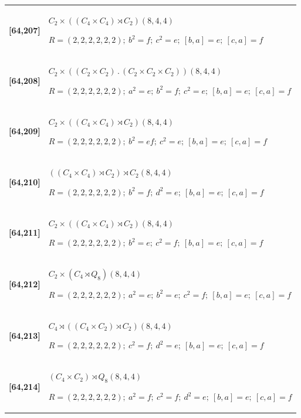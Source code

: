 \documentclass[UTF8,fontset=fandol,11pt,a4paper]{ctexart}
\begin{document}
\begin{longtable}{@{}p{17mm}>{\raggedright\arraybackslash}p{141mm}@{}}
\textbf{[64,207]} & $C_{2}\times ((C_{4}\times C_{4})\rtimes C_{2})$\quad $(8,4,4)$\par\(R=(2,2,2,2,2,2);\allowbreak\ b^{2}=f;\allowbreak\ c^{2}=e;\allowbreak\ [b,a]=e;\allowbreak\ [c,a]=f\)\\[3pt]

\textbf{[64,208]} & $C_{2}\times ((C_{2}\times C_{2})\mathbin{.} (C_{2}\times C_{2}\times C_{2}))$\quad $(8,4,4)$\par\(R=(2,2,2,2,2,2);\allowbreak\ a^{2}=e;\allowbreak\ b^{2}=f;\allowbreak\ c^{2}=e;\allowbreak\ [b,a]=e;\allowbreak\ [c,a]=f\)\\[3pt]

\textbf{[64,209]} & $C_{2}\times ((C_{4}\times C_{4})\rtimes C_{2})$\quad $(8,4,4)$\par\(R=(2,2,2,2,2,2);\allowbreak\ b^{2}=ef;\allowbreak\ c^{2}=e;\allowbreak\ [b,a]=e;\allowbreak\ [c,a]=f\)\\[3pt]

\textbf{[64,210]} & $((C_{4}\times C_{4})\rtimes C_{2})\rtimes C_{2}$\quad $(8,4,4)$\par\(R=(2,2,2,2,2,2);\allowbreak\ b^{2}=f;\allowbreak\ d^{2}=e;\allowbreak\ [b,a]=e;\allowbreak\ [c,a]=f\)\\[3pt]

\textbf{[64,211]} & $C_{2}\times ((C_{4}\times C_{4})\rtimes C_{2})$\quad $(8,4,4)$\par\(R=(2,2,2,2,2,2);\allowbreak\ b^{2}=e;\allowbreak\ c^{2}=f;\allowbreak\ [b,a]=e;\allowbreak\ [c,a]=f\)\\[3pt]

\textbf{[64,212]} & $C_{2}\times (C_{4}\rtimes Q_{8})$\quad $(8,4,4)$\par\(R=(2,2,2,2,2,2);\allowbreak\ a^{2}=e;\allowbreak\ b^{2}=e;\allowbreak\ c^{2}=f;\allowbreak\ [b,a]=e;\allowbreak\ [c,a]=f\)\\[3pt]

\textbf{[64,213]} & $C_{4}\rtimes ((C_{4}\times C_{2})\rtimes C_{2})$\quad $(8,4,4)$\par\(R=(2,2,2,2,2,2);\allowbreak\ c^{2}=f;\allowbreak\ d^{2}=e;\allowbreak\ [b,a]=e;\allowbreak\ [c,a]=f\)\\[3pt]

\textbf{[64,214]} & $(C_{4}\times C_{2})\rtimes Q_{8}$\quad $(8,4,4)$\par\(R=(2,2,2,2,2,2);\allowbreak\ a^{2}=f;\allowbreak\ c^{2}=f;\allowbreak\ d^{2}=e;\allowbreak\ [b,a]=e;\allowbreak\ [c,a]=f\)\\[3pt]


\end{longtable}
\end{document}
